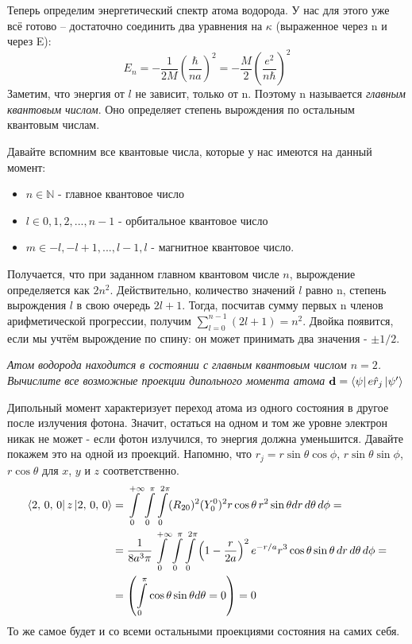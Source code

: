 Теперь определим энергетический спектр атома водорода. У нас для этого уже всё готово -- достаточно соединить два уравнения на $\kappa$ (выраженное через n и через E):
\[
E_n = -\frac{1}{2M}\left(\frac{\hbar}{na}\right)^2 = -\frac{M}{2}\left(\frac{e^2}{n\hbar}\right)^2
\]
Заметим, что энергия от $l$ не зависит, только от n. Поэтому n называется \textit{главным квантовым числом}. Оно определяет степень вырождения по остальным квантовым числам. 

Давайте вспомним все квантовые числа, которые у нас имеются на данный момент:
\begin{itemize}
    \item $n \in \mathbb{N}$ - главное квантовое число
    \item $l \in {0, 1, 2, ..., n-1}$ - орбитальное квантовое число
    \item $m \in {-l, -l+1, ... , l-1, l}$ - магнитное квантовое число.
\end{itemize}
Получается, что при заданном главном квантовом числе $n$, вырождение определяется как $2n^2$. Действительно, количество значений $l$ равно n, степень вырождения $l$ в свою очередь $2l+1$. Тогда, посчитав сумму первых n членов арифметической прогрессии, получим $\sum\limits_{l=0}^{n-1}(2l +1 ) = n^2$. Двойка появится, если мы учтём вырождение по спину: он может принимать два значения - $\pm 1/2$.

\begin{center}
    \textit{Атом водорода находится в состоянии с главным квантовым числом $n = 2$. Вычислите все возможные проекции дипольного момента атома $\mathbf{d} = \bra{\psi}e\hat{r}_j\ket{\psi'}$}
\end{center}

Дипольный момент характеризует переход атома из одного состояния в другое после излучения фотона. Значит, остаться на одном и том же уровне электрон никак не может - если фотон излучился, то энергия должна уменьшится. Давайте покажем это на одной из проекций. Напомню, что $r_j = r\sin\theta\cos\phi$, $r\sin\theta\sin\phi$, $r\cos\theta$ для $x$, $y$ и $z$ соответственно.
\begin{align*}
    \bra{2,\, 0,\, 0}z\ket{2,\, 0,\, 0} &= \int\limits_{0}^{+\infty}\int\limits_{0}^{\pi}\int\limits_{0}^{2\pi}(R_{20})^2(Y^0_0)^2r\cos\theta \, r^2\sin\theta dr\, d\theta\, d\phi =\\& = \frac{1}{8a^3\pi} \int\limits_{0}^{+\infty}\int\limits_{0}^{\pi}\int\limits_{0}^{2\pi} \left( 1 - \frac{r}{2a} \right)^2 e^{-r/a} r^3\cos\theta\sin\theta\, dr \, d\theta\, d\phi = \\ & = \left(\int\limits_{0}^{\pi} \cos\theta \sin\theta d\theta = 0\right) = 0
\end{align*}
То же самое будет и со всеми остальными проекциями состояния на самих себя. 

